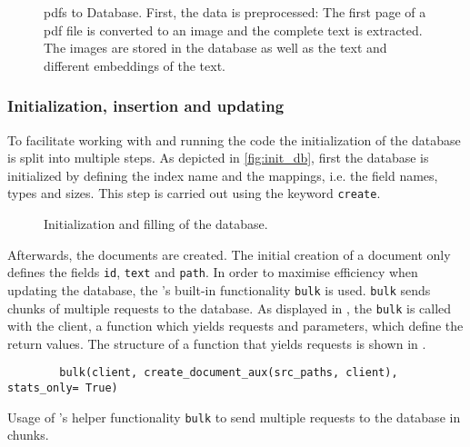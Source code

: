\begin{figure}[htp] %
    \centering
    
    \caption{\acp{pdf} to Database. 
    First, the data is preprocessed:
    The first page of a \ac{pdf} file is converted to an image and the complete text is extracted. 
    The images are stored in the database as well as the text and different embeddings of the text.
    }
    \label{fig:pdf2db}
\end{figure}

\subsubsection*{Initialization, insertion and updating}
To facilitate working with and running the code the initialization of the database is split into multiple steps.
As depicted in \autoref{fig:init_db}, first the database is initialized by defining the index name and the mappings, i.e. the field names, types and sizes.
This step is carried out using the keyword \texttt{create}.

\begin{figure}[htp] %
    \centering
    
    \caption{Initialization and filling of the database.}
    \label{fig:init_db}
\end{figure}

Afterwards, the documents are created.
The initial creation of a document only defines the fields \texttt{id}, \texttt{text} and \texttt{path}.
In order to maximise efficiency when updating the database, the \databaseName{}'s built-in functionality \texttt{bulk} is used.
\texttt{bulk} sends chunks of multiple requests to the database.
As displayed in , the \texttt{bulk} is called with the \databaseName{} client, 
a function which yields requests and parameters, which define the return values.
The structure of a function that yields requests is shown in .

\begin{listing}[htp]
    \begin{verbatim}
        bulk(client, create_document_aux(src_paths, client), stats_only= True)
    \end{verbatim}
    \caption{Usage of \databaseName{}'s helper functionality \texttt{bulk} to send multiple requests to the database in chunks.
    }
    \label{lst:db_bulk}
\end{listing}


